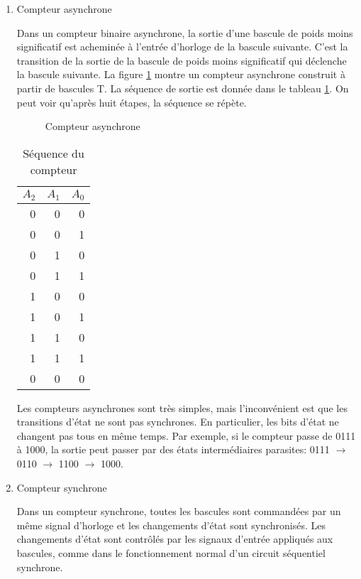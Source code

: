 \documentclass[letter, oneside]{book}
\begin{document}
\begin{enumerate}
\item Compteur asynchrone
\label{sec:org5eb6e2a}

Dans un compteur binaire asynchrone, la sortie d'une bascule de poids
moins significatif est acheminée à l'entrée d'horloge de la bascule
suivante. C'est la transition de la sortie de la bascule de poids
moins significatif qui déclenche la bascule suivante. La figure
\ref{fig:orgaf72e66} montre un compteur asynchrone construit à partir de
bascules T. La séquence de sortie est donnée dans le tableau
\ref{tab:orga40e397}. On peut voir qu'après huit étapes, la séquence se
répète.

\begin{figure}[htbp]
\centering

\caption{\label{fig:orgaf72e66}Compteur asynchrone}
\end{figure}

\begin{table}[htbp]
\caption{\label{tab:orga40e397}Séquence du compteur}
\centering
\begin{tabular}{rrr}
\(A_2\) & \(A_1\) & \(A_0\)\\[0pt]
\hline
0 & 0 & 0\\[0pt]
0 & 0 & 1\\[0pt]
0 & 1 & 0\\[0pt]
0 & 1 & 1\\[0pt]
1 & 0 & 0\\[0pt]
1 & 0 & 1\\[0pt]
1 & 1 & 0\\[0pt]
1 & 1 & 1\\[0pt]
0 & 0 & 0\\[0pt]
\end{tabular}
\end{table}

Les compteurs asynchrones sont très simples, mais l'inconvénient est
que les transitions d'état ne sont pas synchrones. En particulier,
les bits d'état ne changent pas tous en même temps. Par exemple, si le
compteur passe de 0111 à 1000, la sortie peut passer par des états
intermédiaires parasites: 0111 \(\rightarrow\) 0110 \(\rightarrow\) 1100
\(\rightarrow\) 1000.

\item Compteur synchrone
\label{sec:org66a5756}

Dans un compteur synchrone, toutes les bascules sont commandées par un
même signal d'horloge et les changements d'état sont
synchronisés. Les changements d'état sont contrôlés par les signaux
d'entrée appliqués aux bascules, comme dans le fonctionnement normal
d'un circuit séquentiel synchrone.


\end{enumerate}
\end{document}
